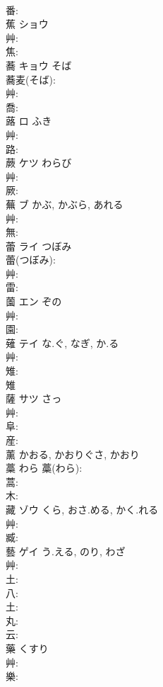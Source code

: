 \documentclass[8pt]{extreport}
\begin{document}
\begin{CJK}{UTF8}{min}
\\	番: 
\\	蕉	ショウ			
\\	艸: 
\\	焦: 
\\	蕎	キョウ	そば		
\\	蕎麦(そば): 
\\	艸: 
\\	喬: 
\\	蕗	ロ	ふき		
\\	艸: 
\\	路: 
\\	蕨	ケツ	わらび		
\\	艸: 
\\	厥: 
\\	蕪	ブ	かぶ, かぶら, あれる		
\\	艸: 
\\	無: 
\\	蕾	ライ	つぼみ		
\\	蕾(つぼみ): 
\\	艸: 
\\	雷: 
\\	薗	エン		ぞの	
\\	艸: 
\\	園: 
\\	薙	テイ	な.ぐ, なぎ, か.る		
\\	艸: 
\\	雉: 
\\	雉 
\\	薩	サツ		さっ	
\\	艸: 
\\	阜: 
\\	産: 
\\	薰		かおる, かおりぐさ, かおり				
\\	藁		わら			藁(わら): 
\\	蒿: 
\\	木: 
\\	藏	ゾウ	くら, おさ.める, かく.れる		
\\	艸: 
\\	臧: 
\\	藝	ゲイ	う.える, のり, わざ		
\\	艸: 
\\	土: 
\\	八: 
\\	土: 
\\	丸: 
\\	云: 
\\	藥		くすり				
\\	艸: 
\\	樂: 

\end{CJK}
\end{document}
